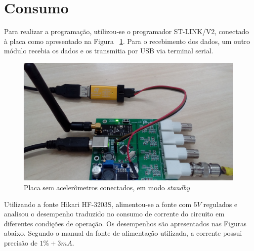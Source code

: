 \documentclass[
	12pt,				%
	openright,			%
	twoside,			%
	a4paper,			%
	english,			%
	french,				%
	spanish,			%
	brazil,				%
	]{abntex2}
\begin{document}
			\newpage

	\section{Consumo}
		Para realizar a programação, utilizou-se o programador
		ST-LINK/V2, conectado à placa como apresentado na Figura ~\ref{fig:accConectados}. Para
		o recebimento dos dados, um outro módulo recebia os dados e
		os transmitia por USB via terminal serial.

		\begin{figure}[!ht]
			\centering
			\includegraphics[width=\linewidth]{../Fotos/stlink.jpg}
			\caption{Placa sem acelerômetros conectados, em modo \textit{standby}}
			\label{fig:accConectados}
		\end{figure}

		Utilizando a fonte Hikari HF-3203S, alimentou-se a fonte com $5V$
		regulados e analisou o desempenho traduzido no consumo de
		corrente do circuito em diferentes condições de operação. Os
		desempenhos são apresentados nas Figuras abaixo. Segundo o
		manual da fonte de alimentação utilizada, a corrente possui
		precisão de $1\% + 3mA$.
\end{document}
